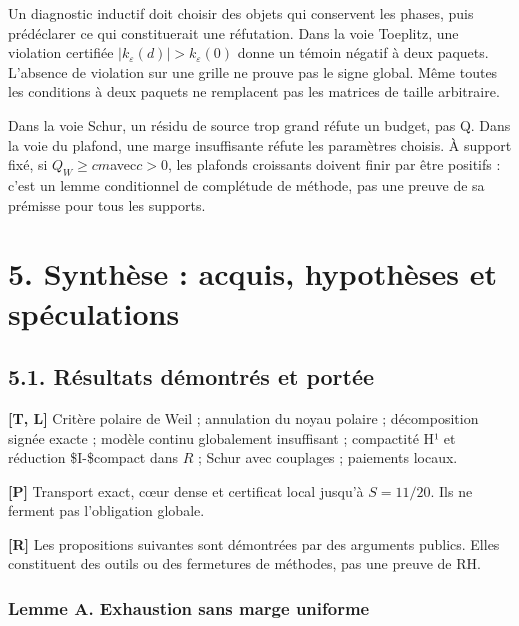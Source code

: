 \documentclass[
  10pt,
  a4paper,
]{article}
\begin{document}
Un diagnostic inductif doit choisir des objets qui conservent les
phases, puis prédéclarer ce qui constituerait une réfutation. Dans la
voie Toeplitz, une violation certifiée
\(|k_\varepsilon(d)|>k_\varepsilon(0)\) donne un témoin négatif à deux
paquets. L'absence de violation sur une grille ne prouve pas le signe
global. Même toutes les conditions à deux paquets ne remplacent pas les
matrices de taille arbitraire.

Dans la voie Schur, un résidu de source trop grand réfute un budget, pas
Q. Dans la voie du plafond, une marge insuffisante réfute les paramètres
choisis. À support fixé, si \(Q_W\ge c m\)avec\(c>0\), les plafonds
croissants doivent finir par être positifs : c'est un lemme conditionnel
de complétude de méthode, pas une preuve de sa prémisse pour tous les
supports.

\hypertarget{synthuxe8se-acquis-hypothuxe8ses-et-spuxe9culations}{%
\section{5. Synthèse : acquis, hypothèses et
spéculations}\label{synthuxe8se-acquis-hypothuxe8ses-et-spuxe9culations}}

\hypertarget{ruxe9sultats-duxe9montruxe9s-et-portuxe9e}{%
\subsection{5.1. Résultats démontrés et
portée}\label{ruxe9sultats-duxe9montruxe9s-et-portuxe9e}}

\textbf{{[}T, L{]}} Critère polaire de Weil ; annulation du noyau
polaire ; décomposition signée exacte ; modèle continu globalement
insuffisant ; compactité H¹ et réduction \$I-\$compact dans \(R\) ;
Schur avec couplages ; paiements locaux.

\textbf{{[}P{]}} Transport exact, cœur dense et certificat local jusqu'à
\(S=11/20\). Ils ne ferment pas l'obligation globale.

\textbf{{[}R{]}} Les propositions suivantes sont démontrées par des
arguments publics. Elles constituent des outils ou des fermetures de
méthodes, pas une preuve de RH.

\hypertarget{lemme-a.-exhaustion-sans-marge-uniforme}{%
\subsubsection{Lemme A. Exhaustion sans marge
uniforme}\label{lemme-a.-exhaustion-sans-marge-uniforme}}
\end{document}
